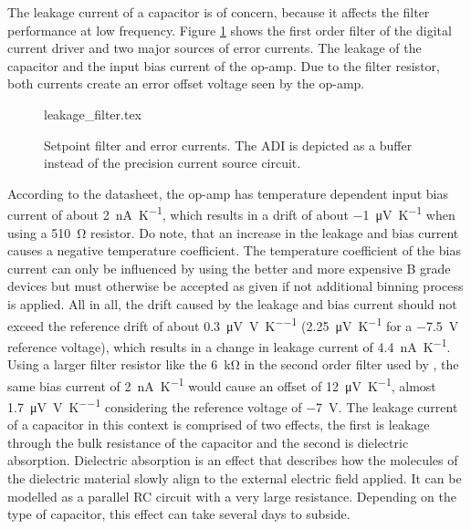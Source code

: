 The leakage current of a capacitor is of concern, because it affects the filter performance at low frequency. Figure \ref{fig:setpoint_filter} shows the first order filter of the digital current driver and two major sources of error currents. The leakage of the capacitor and the input bias current of the op-amp. Due to the filter resistor, both currents create an error offset voltage seen by the op-amp.
\begin{figure}[ht]
    \centering
        {leakage_filter.tex}
    \caption{Setpoint filter and error currents. The ADI  is depicted as a buffer instead of the precision current source circuit.}
    \label{fig:setpoint_filter}
\end{figure}

According to the datasheet, the  op-amp \cite{datasheet_AD797} has temperature dependent input bias current of about \qty[retain-explicit-plus]{+2}{\nA \per \kelvin}, which results in a drift of about \qty{-1}{\uV \per \kelvin} when using a \qty{510}{\ohm} resistor. Do note, that an increase in the leakage and bias current causes a negative temperature coefficient. The temperature coefficient of the bias current can only be influenced by using the better and more expensive B grade devices but must otherwise be accepted as given if not additional binning process is applied. All in all, the drift caused by the leakage and bias current should not exceed the reference drift of about \qty{0.3}{\uV \per \V \per \kelvin} (\qty{2.25}{\uV \per \kelvin} for a \qty{-7.5}{\V} reference voltage), which results in a change in leakage current of \qty{4.4}{\nA \per \kelvin}. Using a larger filter resistor like the \qty{6}{\kilo\ohm} in the second order filter used by \citeauthor{libbrecht_hall} \cite{libbrecht_hall}, the same bias current of \qty{2}{\nA \per \kelvin} would cause an offset of \qty{12}{\uV \per \kelvin}, almost \qty{1.7}{\uV \per \V \per \kelvin} considering the reference voltage of \qty{-7}{\V}. \label{sec:dielectric_absorption} The leakage current of a capacitor in this context is comprised of two effects, the first is leakage through the bulk resistance of the capacitor and the second is dielectric absorption. Dielectric absorption is an effect that describes how the molecules of the dielectric material slowly align to the external electric field applied. It can be modelled as a parallel RC circuit with a very large resistance. Depending on the type of capacitor, this effect can take several days to subside.

